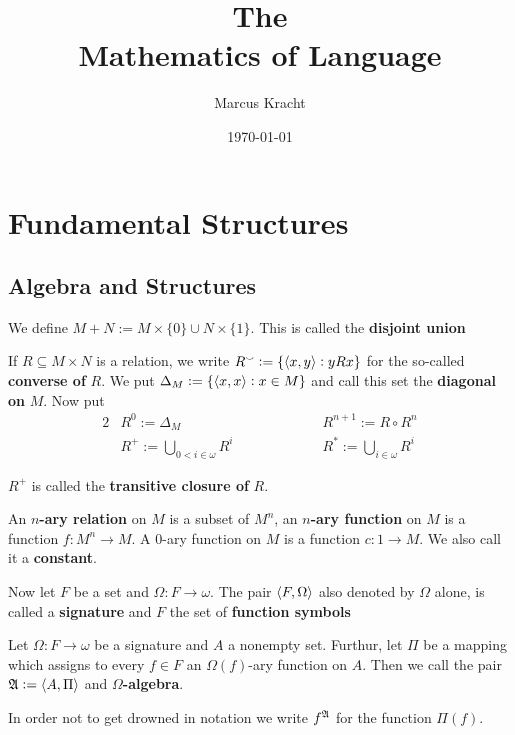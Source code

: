 \documentclass[11pt]{article}
\author{Marcus Kracht}
\date{\today}
\title{\myfont The \\ Mathematics of Language}
\begin{document}
\maketitle \clearpage
\setcounter{tocdepth}{2}
\tableofcontents \clearpage

\section{Fundamental Structures}
\label{sec:orgd88c96b}
\subsection{Algebra and Structures}
\label{sec:org880f47f}
We define \(M+N:=M\times\{0\}\cup N\times\{1\}\). This is called the
\textbf{disjoint union}

If \(R\subseteq M\times N\) is a relation, we write 
\(R^\smallsmile:=\{\langle x,y\rangle:yRx\}\) for the so-called \textbf{converse of} \(R\). We
put \(\Delta_M:=\{\langle x,x\rangle:x\in M\}\) and call this set the \textbf{diagonal on}
\(M\). Now put
\begin{alignat*}{2}
&R^0:=\Delta_M\hspace{2cm} &&R^{n+1}:=R\circ R^n\\
&R^+:=\displaystyle\bigcup_{0<i\in\omega}R^i\hspace{2cm}
&&R^{*}:=\displaystyle\bigcup_{i\in\omega}R^i
\end{alignat*}

\(R^+\) is called the \textbf{transitive closure of} \(R\).

An \textbf{\(n\)-ary relation} on \(M\) is a subset of \(M^n\), an \textbf{\(n\)-ary function} on
\(M\) is a function \(f:M^n\to M\). A 0-ary function on \(M\) is a function
\(c:1\to M\). We also call it a \textbf{constant}.

Now let \(F\) be a set and \(\Omega:F\to\omega\). The pair \(\langle F,\Omega\rangle\) also
denoted by \(\Omega\) alone, is called a \textbf{signature} and \(F\) the set of \textbf{function symbols}

\begin{definition}[]
Let \(\Omega:F\to \omega\) be a signature and \(A\) a nonempty set. Furthur, let \(\Pi\)
be a mapping which assigns to every \(f\in F\) an \(\Omega(f)\)-ary function on
\(A\). Then we call the pair \(\mathfrak{A}:=\langle A,\Pi\rangle\) and \textbf{\(\Omega\)-algebra}.
\end{definition}

In order not to get drowned in notation we write \(f^{\mathfrak{A}}\) for the function
\(\Pi(f)\). 
\end{document}
